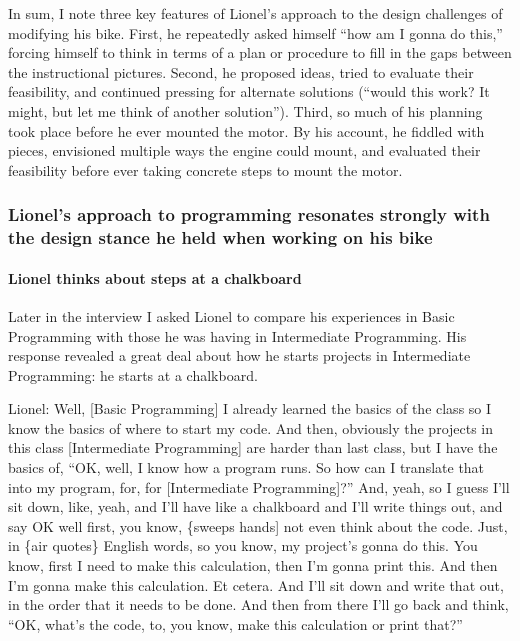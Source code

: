 In sum, I note three key features of Lionel's approach to the design
challenges of modifying his bike. First, he repeatedly asked himself
``how am I gonna do this,'' forcing himself to think in terms of a plan
or procedure to fill in the gaps between the instructional pictures.
Second, he proposed ideas, tried to evaluate their feasibility, and
continued pressing for alternate solutions (``would this work? It might,
but let me think of another solution''). Third, so much of his planning
took place before he ever mounted the motor. By his account, he fiddled
with pieces, envisioned multiple ways the engine could mount, and
evaluated their feasibility before ever taking concrete steps to mount
the motor.

\subsubsection{Lionel's approach to programming resonates strongly with
the design stance he held when working on his
bike}\label{lionels-approach-to-programming-resonates-strongly-with-the-design-stance-he-held-when-working-on-his-bike}

\paragraph{Lionel thinks about steps at a
chalkboard}\label{lionel-thinks-about-steps-at-a-chalkboard}

Later in the interview I asked Lionel to compare his experiences in
Basic Programming with those he was having in Intermediate Programming.
His response revealed a great deal about how he starts projects in
Intermediate Programming: he starts at a chalkboard.

Lionel: Well, {[}Basic Programming{]} I already learned the basics of
the class so I know the basics of where to start my code. And then,
obviously the projects in this class {[}Intermediate Programming{]} are
harder than last class, but I have the basics of, ``OK, well, I know how
a program runs. So how can I translate that into my program, for, for
{[}Intermediate Programming{]}?'' And, yeah, so I guess I'll sit down,
like, yeah, and I'll have like a chalkboard and I'll write things out,
and say OK well first, you know, \{sweeps hands{]} not even think about
the code. Just, in \{air quotes\} English words, so you know, my
project's gonna do this. You know, first I need to make this
calculation, then I'm gonna print this. And then I'm gonna make this
calculation. Et cetera. And I'll sit down and write that out, in the
order that it needs to be done. And then from there I'll go back and
think, ``OK, what's the code, to, you know, make this calculation or
print that?''

